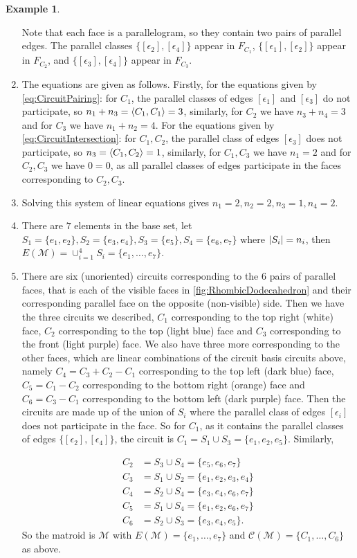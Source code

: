 \documentclass[12pt]{report}
\theoremstyle{definition}
\newtheorem{example}[theorem]{Example}
\DeclarePairedDelimiter\abs{\lvert}{\rvert}
\DeclarePairedDelimiter\iprod{\langle}{\rangle}
\def\calC{\mathcal C}
\def\calM{\mathcal M}
\theoremstyle{upright}
\begin{document}
\begin{example}
\begin{enumerate}
        Note that each face is a parallelogram, so they contain two pairs of parallel edges.
        The parallel classes $\{[\epsilon_2], [\epsilon_4]\}$ appear in $F_{C_1}$, $\{[\epsilon_1], [\epsilon_2]\}$ appear in $F_{C_2}$, and $\{[\epsilon_3], [\epsilon_4]\}$ appear in $F_{C_3}$.
        \item The equations are given as follows.
        Firstly, for the equations given by \eqref{eq:CircuitPairing}: for $C_1$, the parallel classes of edges $[\epsilon_1]$ and $[\epsilon_3]$ do not participate, so $n_1+n_3=\iprod*{C_1, C_1}=3$, similarly, for $C_2$ we have $n_3+n_4=3$ and for $C_3$ we have $n_1+n_2=4$.
        For the equations given by \eqref{eq:CircuitIntersection}: for $C_1, C_2$, the parallel class of edges $[\epsilon_3]$ does not participate, so $n_3=\iprod*{C_1, C_2}=1$, similarly, for $C_1, C_3$ we have $n_1=2$ and for $C_2, C_3$ we have $0=0$, as all parallel classes of edges participate in the faces corresponding to $C_2, C_3$.
        \item Solving this system of linear equations gives $n_1=2, n_2=2, n_3=1, n_4=2$.
        \item There are $7$ elements in the base set, let $S_1=\{e_1, e_2\}, S_2=\{e_3, e_4\}, S_3=\{e_5\}, S_4=\{e_6, e_7\}$ where $\abs*{S_i}=n_i$, then $E(\calM)=\cup_{i=1}^4 S_i=\{e_1, \dots, e_7\}$.
        \item There are six (unoriented) circuits corresponding to the $6$ pairs of parallel faces, that is each of the visible faces in \cref{fig:RhombicDodecahedron} and their corresponding parallel face on the opposite (non-visible) side.
        Then we have the three circuits we described, $C_1$ corresponding to the top right (white) face, $C_2$ corresponding to the top (light blue) face and $C_3$ corresponding to the front (light purple) face.
        We also have three more corresponding to the other faces, which are linear combinations of the circuit basis circuits above, namely $C_4=C_3+C_2-C_1$ corresponding to the top left (dark blue) face, $C_5=C_1-C_2$ corresponding to the bottom right (orange) face and $C_6=C_3-C_1$ corresponding to the bottom left (dark purple) face.
        Then the circuits are made up of the union of $S_i$ where the parallel class of edges $[\epsilon_i]$ does not participate in the face.
        So for $C_1$, as it contains the parallel classes of edges $\{[\epsilon_2], [\epsilon_4]\}$, the circuit is $C_1=S_1\cup S_3=\{e_1, e_2, e_5\}$.
        Similarly,
    
        \[\begin{aligned}
            C_2&=S_3\cup S_4=\{e_5, e_6, e_7\}\\
            C_3&=S_1\cup S_2=\{e_1, e_2, e_3, e_4\}\\
            C_4&=S_2\cup S_4=\{e_3, e_4, e_6, e_7\}\\
            C_5&=S_1\cup S_4=\{e_1, e_2, e_6, e_7\}\\
            C_6&=S_2\cup S_3=\{e_3, e_4, e_5\}.
        \end{aligned}\]
        So the matroid is $\calM$ with $E(\calM)=\{e_1, \dots, e_7\}$ and $\calC(\calM)=\{C_1, \dots, C_6\}$ as above.
    \end{enumerate}


\end{example}
\end{document}

